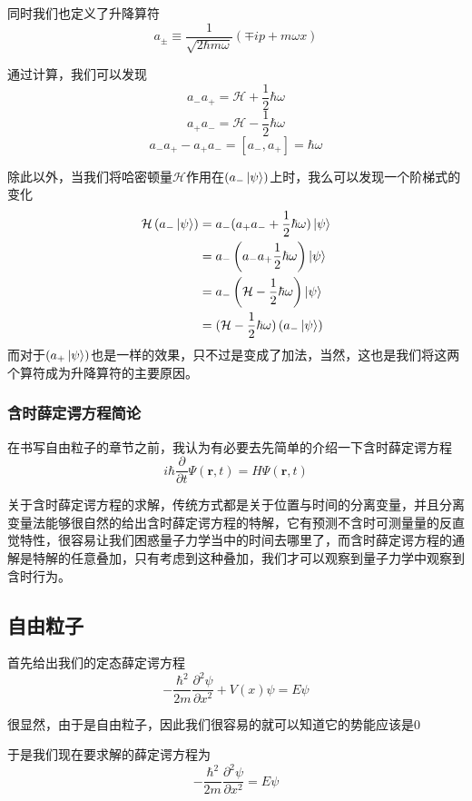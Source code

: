 \documentclass{article}
\begin{document}
同时我们也定义了升降算符
\[ a_{\pm }\equiv \frac{1}{\sqrt{2\hbar m\omega}}(\mp ip +m\omega x)\]

通过计算，我们可以发现
\[a_{-}a_{+}=\mathcal{H}+\frac{1}{2}\hbar\omega\]
\[a_{+}a_{-}=\mathcal{H}-\frac{1}{2}\hbar\omega\]
\[a_{-}a_{+}-a_{+}a_{-}=\left[a_{-},a_{+}\right]=\hbar\omega\]

除此以外，当我们将哈密顿量$\mathcal{H}$作用在$(a_{-}\ket{\psi})$上时，我么可以发现一个阶梯式的变化
\begin{align*}
	\mathcal{H}\left(a_{-}\ket{\psi}\right) & =a_{-}(a_{+}a_{-}+\frac{1}{2}\hbar\omega)\ket{\psi}               \\
	                                        & =a_{-}\left(a_{-}a_{+}\frac{1}{2}\hbar\omega\right)\ket{\psi}     \\
	                                        & =a_{-}\left(\mathcal{H}-\frac{1}{2}\hbar\omega\right)\ket{\psi}   \\
	                                        & =(\mathcal{H}-\frac{1}{2}\hbar\omega)\left(a_{-}\ket{\psi}\right)
\end{align*}
而对于$(a_{+}\ket{\psi})$也是一样的效果，只不过是变成了加法，当然，这也是我们将这两个算符成为升降算符的主要原因。



\subsubsection{含时薛定谔方程简论}
在书写自由粒子的章节之前，我认为有必要去先简单的介绍一下含时薛定谔方程
\[
	i\hbar\frac{\partial}{\partial t}\Psi(\textbf{r},t)=H\Psi(\textbf{r},t)
\]

关于含时薛定谔方程的求解，传统方式都是关于位置与时间的分离变量，并且分离变量法能够很自然的给出含时薛定谔方程的特解，它有预测不含时可测量量的反直觉特性，很容易让我们困惑量子力学当中的时间去哪里了，而含时薛定谔方程的通解是特解的任意叠加，只有考虑到这种叠加，我们才可以观察到量子力学中观察到含时行为。




\subsection{自由粒子}
首先给出我们的定态薛定谔方程
\[
	-\frac{\hbar^2}{2m}\frac{\partial^2\psi}{\partial x^2}+V(x)\psi=E\psi
\]

很显然，由于是自由粒子，因此我们很容易的就可以知道它的势能应该是$0$

于是我们现在要求解的薛定谔方程为
\[
	-\frac{\hbar^2}{2m}\frac{\partial^2\psi}{\partial x^2}=E\psi
\]
\end{document}
